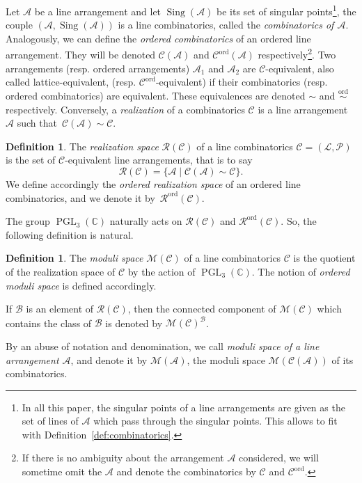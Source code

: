 \documentclass[11pt, a4paper]{amsart}
\theoremstyle{definition}
\newtheorem{definition}[theorem]{Definition}
\theoremstyle{remark}
\newcommand{\CC}{\mathds{C}}
\newcommand{\A}{\mathcal{A}}
\newcommand{\B}{\mathcal{B}}
\newcommand{\R}{\mathcal{R}}
\newcommand{\C}{\mathcal{C}}
\newcommand{\M}{\mathcal{M}}
\renewcommand{\P}{\mathcal{P}}
\renewcommand{\L}{\mathcal{L}}
\newcommand{\osim}{\stackrel{\ord}{\sim}}
\newcommand{\ord}{\text{ord}}
\DeclareMathOperator{\sing}{Sing}
\DeclareMathOperator{\PGL}{PGL}
\begin{document}
Let $\A$ be a line arrangement and let $\sing(\A)$ be its set of singular points\footnote{In all this paper, the singular points of a line arrangements are given as the set of lines of $\A$ which pass through the singular points. This allows to fit with Definition~\ref{def:combinatorics}.}, the couple $(\A,\sing(\A))$ is a line combinatorics, called the \emph{combinatorics of $\A$}. Analogously, we can define the \emph{ordered combinatorics} of an ordered line arrangement. They will be denoted $\C(\A)$ and $\C^{\ord}(\A)$ respectively\footnote{If there is no ambiguity about the arrangement $\A$ considered, we will sometime omit the $\A$ and denote the combinatorics by $\C$ and $\C^{\ord}$.}. Two arrangements (resp. ordered arrangements) $\A_1$ and $\A_2$ are $\C$-equivalent, also called lattice-equivalent, (resp. $\C^{\ord}$-equivalent) if their combinatorics (resp. ordered combinatorics) are equivalent. These equivalences are denoted $\sim$ and $\osim$ respectively. Conversely, a \emph{realization} of a combinatorics $\C$ is a line arrangement $\A$ such that~$\C(\A)\sim \C$.

\begin{definition}
	The \emph{realization space} $\R(\C)$ of a line combinatorics $\C=(\L,\P)$ is the set of $\C$-equivalent line arrangements, that is to say
	\begin{equation*}
		\R(\C) = \{ \A \mid \C(\A)\sim \C \}.
	\end{equation*}
	We define accordingly the \emph{ordered realization space} of an ordered line combinatorics, and we denote it by~$\R^{\ord}(\C)$.
\end{definition}

The group $\PGL_3(\CC)$ naturally acts on $\R(\C)$ and $\R^{\ord}(\C)$. So, the following definition is natural.

\begin{definition}
	The \emph{moduli space} $\M(\C)$ of a line combinatorics $\C$ is the quotient of the realization space of $\C$ by the action of $\PGL_3(\CC)$. The notion of \emph{ordered moduli space} is defined accordingly.
	
	If $\B$ is an element of $\R(\C)$, then the connected component of $\M(\C)$ which contains the class of $\B$ is denoted by $\M(\C)^\B$.
\end{definition}

By an abuse of notation and denomination, we call \emph{moduli space of a line arrangement $\A$}, and denote it by $\M(\A)$, the moduli space $\M(\C(\A))$ of its combinatorics.
\end{document}
